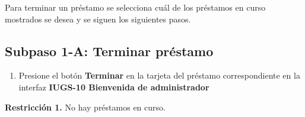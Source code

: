 Para terminar un préstamo se selecciona cuál de los préstamos en curso mostrados se desea y se siguen los siguientes pasos.
\subsection{Subpaso 1-A: Terminar préstamo}
\begin{enumerate}
	\item Presione el botón \textbf{Terminar} en la tarjeta del préstamo 
		correspondiente en la interfaz 
		\textbf{IUGS-10 Bienvenida de administrador}
\end{enumerate}

\textbf{Restricción 1.} No hay préstamos en curso. 
